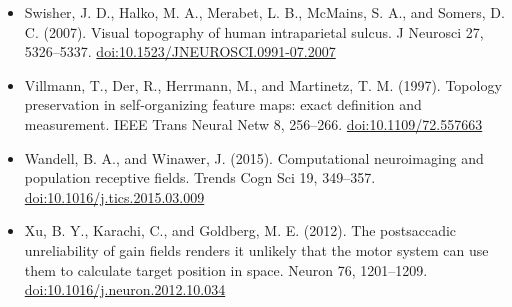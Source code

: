 \documentclass[11pt,a4paper]{article}
\newcommand{\doi}[1]{\href{https://doi.org/#1}{doi:#1}}
\begin{document}
\begin{itemize}[itemsep=1pt,topsep=2pt]
  \item Swisher, J. D., Halko, M. A., Merabet, L. B., McMains, S. A., and Somers, D. C. (2007). Visual topography of human intraparietal sulcus. J Neurosci 27, 5326--5337. \doi{10.1523/JNEUROSCI.0991-07.2007}
  \item Villmann, T., Der, R., Herrmann, M., and Martinetz, T. M. (1997). Topology preservation in self-organizing feature maps: exact definition and measurement. IEEE Trans Neural Netw 8, 256--266. \doi{10.1109/72.557663}
  \item Wandell, B. A., and Winawer, J. (2015). Computational neuroimaging and population receptive fields. Trends Cogn Sci 19, 349--357. \doi{10.1016/j.tics.2015.03.009}
  \item Xu, B. Y., Karachi, C., and Goldberg, M. E. (2012). The postsaccadic unreliability of gain fields renders it unlikely that the motor system can use them to calculate target position in space. Neuron 76, 1201--1209. \doi{10.1016/j.neuron.2012.10.034}
\end{itemize}
\end{document}
